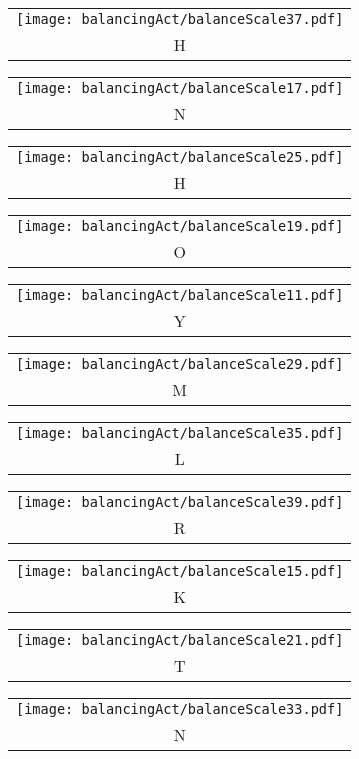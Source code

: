 \begin{puzzle}
\begin{center}
    \begin{tabular}{c}\texttt{[image: balancingAct/balanceScale37.pdf]}\\H\end{tabular}
    \begin{tabular}{c}\texttt{[image: balancingAct/balanceScale17.pdf]}\\N\end{tabular}
    \begin{tabular}{c}\texttt{[image: balancingAct/balanceScale25.pdf]}\\H\end{tabular}
  \end{center}
  \begin{center}
    \begin{tabular}{c}\texttt{[image: balancingAct/balanceScale19.pdf]}\\O\end{tabular}
    \begin{tabular}{c}\texttt{[image: balancingAct/balanceScale11.pdf]}\\Y\end{tabular}
    \begin{tabular}{c}\texttt{[image: balancingAct/balanceScale29.pdf]}\\M\end{tabular}
    \begin{tabular}{c}\texttt{[image: balancingAct/balanceScale35.pdf]}\\L\end{tabular}
  \end{center}
  \begin{center}
    \begin{tabular}{c}\texttt{[image: balancingAct/balanceScale39.pdf]}\\R\end{tabular}
    \begin{tabular}{c}\texttt{[image: balancingAct/balanceScale15.pdf]}\\K\end{tabular}
    \begin{tabular}{c}\texttt{[image: balancingAct/balanceScale21.pdf]}\\T\end{tabular}
    \begin{tabular}{c}\texttt{[image: balancingAct/balanceScale33.pdf]}\\N\end{tabular}

\end{center}
\end{puzzle}
